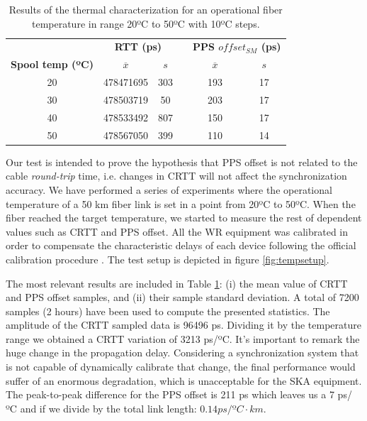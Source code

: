 \begin{table}\centering
	\begin{tabular}{@{} cccccc@{}}%
		& \multicolumn{2}{c}{\bfseries{RTT (ps)}} & &
		\multicolumn{2}{c}{\bfseries{PPS $offset_{SM}$ (ps)}} \\
		\cmidrule(l){2-3}  \cmidrule{5-6}
		\textbf{Spool temp (ºC)} & $\overline{x}$ & $s$ & & $\overline{x}$ 
		& $s$ \\ \midrule
		\small{20} & 478471695 & 303 & & 193 & 17 \\
		\small{30} & 478503719 & 50  & & 203 & 17 \\
		\small{40} & 478533492 & 807 & & 150 & 17 \\
		\small{50} & 478567050 & 399 & & 110 & 14 \\
		\bottomrule
	\end{tabular}
	\caption{Results of the thermal characterization for an operational fiber 
		temperature in range 20ºC to 50ºC with 10ºC steps.}
	\label{tab:temp}
\end{table}

Our test is intended to prove the hypothesis that PPS offset is not related to 
the cable \textit{round-trip} time, i.e. changes in CRTT will not affect the 
synchronization accuracy. We have performed a series of experiments where the 
operational temperature of a 50 km fiber link is set in a point from 20ºC to 
50ºC. When the fiber reached the target temperature, we started to measure the 
rest of dependent values such as CRTT and PPS offset. All the WR equipment was 
calibrated in order to compensate the characteristic delays of each device 
following the official calibration procedure \cite{man:calib}.  The test setup 
is depicted in figure \ref{fig:tempsetup}.

The most relevant results are included in Table \ref{tab:temp}: (i) the mean 
value of CRTT and PPS offset samples, and (ii) their sample standard deviation. 
A total of 7200 samples (2 hours) have been used to compute the presented 
statistics. The amplitude of the CRTT sampled data is 96496 ps. Dividing it by 
the temperature range we obtained a CRTT variation of 3213 ps/ºC. It's 
important to remark the huge change in the propagation delay. Considering a 
synchronization system that is not capable of dynamically calibrate that 
change, the final performance would suffer of an enormous degradation, which is 
unacceptable for the SKA equipment. The peak-to-peak difference for the PPS 
offset is 211 ps which leaves us a 7 ps/ºC and if we divide by the total link 
length: $0.14 ps/ºC \cdot km$.

